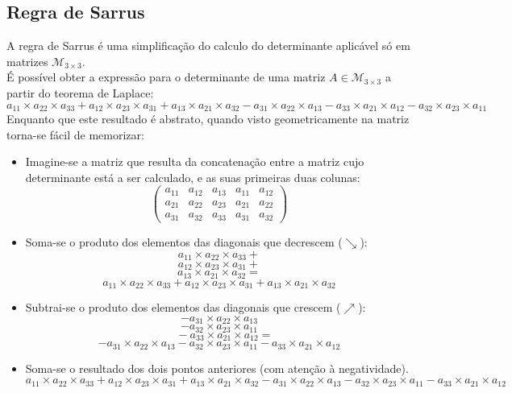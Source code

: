 \documentclass[]{report}
\begin{document}
\subsection{Regra de Sarrus}
\begin{minipage}{\textwidth}
A regra de Sarrus é uma simplificação do calculo do determinante aplicável só em matrizes $\mathcal{M}_{3\times 3}$.\\
É possível obter a expressão para o determinante de uma matriz $A \in \mathcal{M}_{3 \times 3}$ a partir do teorema de Laplace:
$$a_{11} \times a_{22} \times a_{33} + a_{12} \times a_{23} \times a_{31} + a_{13} \times a_{21} \times a_{32}
 - a_{31} \times a_{22} \times a_{13} - a_{33} \times a_{21} \times a_{12} - a_{32} \times a_{23} \times a_{11}$$
Enquanto que este resultado é abstrato, quando visto geometricamente na matriz torna-se fácil de memorizar:
\begin{itemize}
\item Imagine-se a matriz que resulta da concatenação entre a matriz cujo determinante está a ser calculado, e as suas primeiras duas colunas:
$$
\left(\begin{array}{ccc|cc}
  a_{11} & a_{12} & a_{13} & a_{11} & a_{12} \\
  a_{21} & a_{22} & a_{23} & a_{21} & a_{22} \\
  a_{31} & a_{32} & a_{33} & a_{31} & a_{32}
\end{array}\right)
$$
\item Soma-se o produto dos elementos das diagonais que decrescem ($\searrow$):
$$a_{11} \times a_{22} \times a_{33} +$$
$$a_{12} \times a_{23} \times a_{31} +$$
$$a_{13} \times a_{21} \times a_{32} =$$
$$a_{11} \times a_{22} \times a_{33} + a_{12} \times a_{23} \times a_{31} + a_{13} \times a_{21} \times a_{32}$$
\item Subtrai-se o produto dos elementos das diagonais que crescem ($\nearrow$):
$$- a_{31} \times a_{22} \times a_{13}$$
$$- a_{32} \times a_{23} \times a_{11}$$
$$\quad- a_{33} \times a_{21} \times a_{12}=$$
$$- a_{31} \times a_{22} \times a_{13} - a_{32} \times a_{23} \times a_{11} - a_{33} \times a_{21} \times a_{12}$$
\item Soma-se o resultado dos dois pontos anteriores (com atenção à negatividade).
$$a_{11} \times a_{22} \times a_{33} + a_{12} \times a_{23} \times a_{31} + a_{13} \times a_{21} \times a_{32} - a_{31} \times a_{22} \times a_{13} - a_{32} \times a_{23} \times a_{11} - a_{33} \times a_{21} \times a_{12}$$
\end{itemize}
\begin{center}

\end{center}
\end{minipage}
\end{document}

